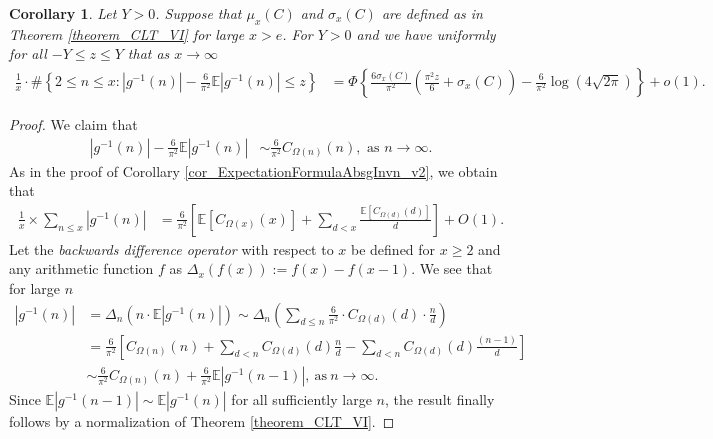 \documentclass[11pt,reqno,a4letter]{article}
\numberwithin{figure}{section}
\numberwithin{table}{section}
\theoremstyle{plain}
\newtheorem{cor}[theorem]{Corollary}
\numberwithin{theorem}{section}
\theoremstyle{definition}
\begin{document}
\begin{cor} 
\label{cor_CLT_VII} 
Let $Y > 0$. Suppose that $\mu_x(C)$ and $\sigma_x(C)$ are defined as in 
Theorem \ref{theorem_CLT_VI} for large $x > e$. 
For $Y > 0$ and we have uniformly for all $-Y \leq z \leq Y$ 
that as $x \rightarrow \infty$ 
\begin{align*} 
\frac{1}{x} \cdot \#\left\{2 \leq n \leq x:|g^{-1}(n)| - 
     \frac{6}{\pi^2} \mathbb{E}|g^{-1}(n)| \leq z\right\} & = 
     \Phi\left\{\frac{6 \sigma_x(C)}{\pi^2}\left(\frac{\pi^2 z}{6} + \sigma_x(C)\right) - 
     \frac{6}{\pi^2} \log(4\sqrt{2\pi})\right\} + o(1). 
\end{align*} 
\end{cor} 
\begin{proof} 
We claim that 
\begin{align*} 
|g^{-1}(n)| - \frac{6}{\pi^2} \mathbb{E}|g^{-1}(n)| & \sim \frac{6}{\pi^2} C_{\Omega(n)}(n), 
     \text{\ as\ } n \rightarrow \infty. 
\end{align*} 
As in the proof of Corollary \ref{cor_ExpectationFormulaAbsgInvn_v2}, 
we obtain that 
\begin{align*} 
\frac{1}{x} \times \sum_{n \leq x} |g^{-1}(n)| & = 
     \frac{6}{\pi^2} \left[\mathbb{E}[C_{\Omega(x)}(x)] + \sum_{d<x} 
     \frac{\mathbb{E}[C_{\Omega(d)}(d)]}{d}\right] + O(1). 
\end{align*} 
Let the \emph{backwards difference operator} with respect to $x$ 
be defined for $x \geq 2$ and any arithmetic function $f$ as 
$\Delta_x(f(x)) := f(x) - f(x-1)$. 
We see that for large $n$ 
\begin{align*} 
|g^{-1}(n)| & = \Delta_n(n \cdot \mathbb{E}|g^{-1}(n)|) 
     \sim \Delta_n\left(\sum_{d \leq n} \frac{6}{\pi^2} \cdot C_{\Omega(d)}(d) \cdot \frac{n}{d}\right) \\ 
     & = \frac{6}{\pi^2}\left[C_{\Omega(n)}(n) + \sum_{d < n} C_{\Omega(d)}(d) \frac{n}{d} - 
     \sum_{d<n} C_{\Omega(d)}(d) \frac{(n-1)}{d}\right] \\ 
     & \sim \frac{6}{\pi^2} C_{\Omega(n)}(n) + \frac{6}{\pi^2} \mathbb{E}|g^{-1}(n-1)|, 
     \mathrm{\ as\ } n \rightarrow \infty. 
\end{align*} 
Since $\mathbb{E}|g^{-1}(n-1)| \sim \mathbb{E}|g^{-1}(n)|$ for all sufficiently large $n$, 
the result finally follows by a normalization of Theorem \ref{theorem_CLT_VI}. 
\end{proof} 
\end{document}
